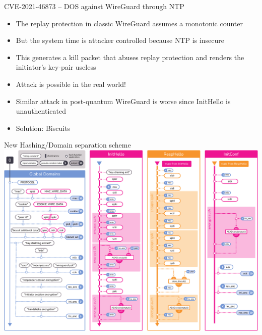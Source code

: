 \documentclass{rosenpass-beamer}
\begin{document}

\maketitle


\begin{frame}{CVE-2021-46873 – DOS against WireGuard through NTP}
\begin{itemize}
  \item The replay protection in classic WireGuard assumes a monotonic counter
  \item But the system time is attacker controlled because NTP is insecure
  \item This generates a kill packet that abuses replay protection and renders the initiator's key-pair useless
  \item Attack is possible in the real world!
  \item Similar attack in post-quantum WireGuard is worse since InitHello is unauthenticated
  \item Solution: Biscuits
\end{itemize}
\end{frame}

\begin{frame}{New Hashing/Domain separation scheme}
  \includegraphics[height=.9\textheight]{graphics/rosenpass-wp-hashing-tree.pdf}
\end{frame}
\end{document}
